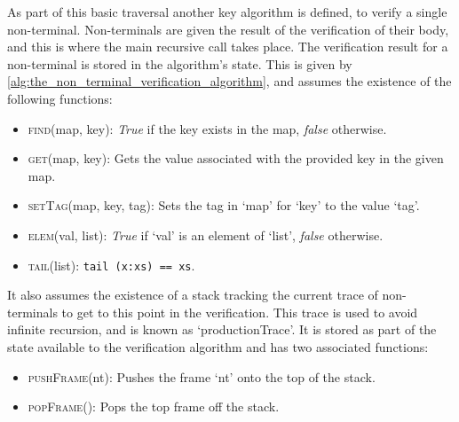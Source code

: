 As part of this basic traversal another key algorithm is defined, to verify a single non-terminal. 
Non-terminals are given the result of the verification of their body, and this is where the main recursive call takes place. 
The verification result for a non-terminal is stored in the algorithm's state.
This is given by \autoref{alg:the_non_terminal_verification_algorithm}, and assumes the existence of the following functions:
\begin{itemize}
    \item \textsc{find}(map, key): \textit{True} if the key exists in the map, \textit{false} otherwise.
    \item \textsc{get}(map, key): Gets the value associated with the provided key in the given map.
    \item \textsc{setTag}(map, key, tag): Sets the tag in `map' for `key' to the value `tag'. 
    \item \textsc{elem}(val, list): \textit{True} if `val' is an element of `list', \textit{false} otherwise. 
    \item \textsc{tail}(list): \texttt{tail (x:xs) == xs}.
\end{itemize}

It also assumes the existence of a stack tracking the current trace of non-terminals to get to this point in the verification. 
This trace is used to avoid infinite recursion, and is known as `productionTrace'. 
It is stored as part of the state available to the verification algorithm and has two associated functions:
\begin{itemize}
    \item \textsc{pushFrame}(nt): Pushes the frame `nt' onto the top of the stack.
    \item \textsc{popFrame}(): Pops the top frame off the stack.
\end{itemize}

